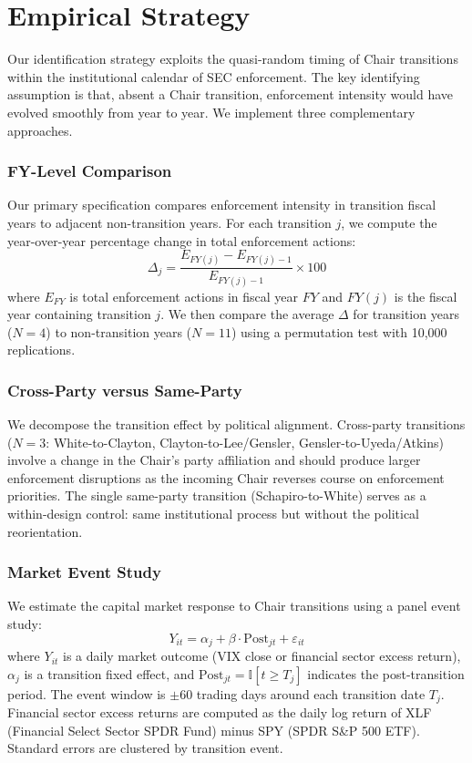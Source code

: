 \documentclass[12pt]{article}
\newcommand{\ind}{\mathbb{I}}
\begin{document}
\section{Empirical Strategy}

Our identification strategy exploits the quasi-random timing of Chair transitions within the institutional calendar of SEC enforcement. The key identifying assumption is that, absent a Chair transition, enforcement intensity would have evolved smoothly from year to year. We implement three complementary approaches.

\subsubsection*{FY-Level Comparison} Our primary specification compares enforcement intensity in transition fiscal years to adjacent non-transition years. For each transition $j$, we compute the year-over-year percentage change in total enforcement actions:
\begin{equation}
\Delta_j = \frac{E_{FY(j)} - E_{FY(j)-1}}{E_{FY(j)-1}} \times 100
\end{equation}
where $E_{FY}$ is total enforcement actions in fiscal year $FY$ and $FY(j)$ is the fiscal year containing transition $j$. We then compare the average $\Delta$ for transition years ($N=4$) to non-transition years ($N=11$) using a permutation test with 10,000 replications.

\subsubsection*{Cross-Party versus Same-Party} We decompose the transition effect by political alignment. Cross-party transitions ($N=3$: White-to-Clayton, Clayton-to-Lee/Gensler, Gensler-to-Uyeda/Atkins) involve a change in the Chair's party affiliation and should produce larger enforcement disruptions as the incoming Chair reverses course on enforcement priorities. The single same-party transition (Schapiro-to-White) serves as a within-design control: same institutional process but without the political reorientation.

\subsubsection*{Market Event Study} We estimate the capital market response to Chair transitions using a panel event study:
\begin{equation}
Y_{it} = \alpha_j + \beta \cdot \text{Post}_{jt} + \varepsilon_{it}
\end{equation}
where $Y_{it}$ is a daily market outcome (VIX close or financial sector excess return), $\alpha_j$ is a transition fixed effect, and $\text{Post}_{jt} = \ind[t \geq T_j]$ indicates the post-transition period. The event window is $\pm$60 trading days around each transition date $T_j$. Financial sector excess returns are computed as the daily log return of XLF (Financial Select Sector SPDR Fund) minus SPY (SPDR S\&P 500 ETF). Standard errors are clustered by transition event.
\end{document}
